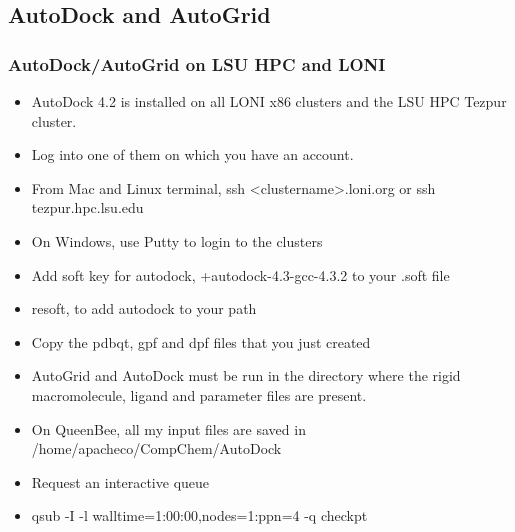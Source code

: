 \documentclass[slidestop,mathserif,compress,xcolor=svgnames]{beamer}
\begin{document}
\subsection{AutoDock and AutoGrid}
\begin{frame}
  \frametitle{\small AutoDock/AutoGrid on LSU HPC and LONI}
  \begin{block}{}
    \begin{itemize}
      \item AutoDock 4.2 is installed on all LONI x86 clusters and the LSU HPC Tezpur cluster.
      \item Log into one of them on which you have an account.
      \item From Mac and Linux terminal, ssh <clustername>.loni.org or ssh tezpur.hpc.lsu.edu
      \item On Windows, use Putty to login to the clusters
      \item Add soft key for autodock, +autodock-4.3-gcc-4.3.2 to your .soft file
      \item resoft, to add autodock to your path
      \item Copy the pdbqt, gpf and dpf files that you just created
      \item AutoGrid and AutoDock must be run in the directory where the rigid macromolecule, ligand and parameter files are present.
      \item On QueenBee, all my input files are saved in /home/apacheco/CompChem/AutoDock
      \item Request an interactive queue
      \item[] qsub -I -l walltime=1:00:00,nodes=1:ppn=4 -q checkpt
    \end{itemize}
  \end{block}
\end{frame}
\end{document}
